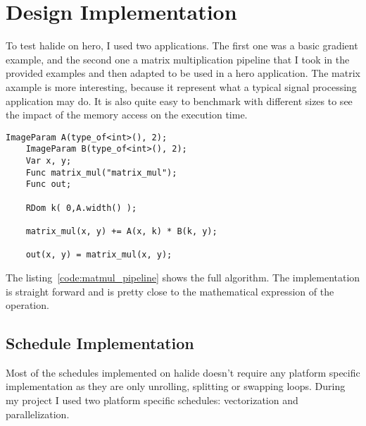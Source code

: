 

\chapter{Design Implementation}
	To test halide on hero, I used two applications. The first one was a basic gradient example, and the second one a matrix multiplication pipeline that I took in the provided examples and then adapted to be used in a hero application.
The matrix axample is more interesting, because it represent what a typical signal processing application may do. It is also quite easy to benchmark with different sizes to see the impact of the memory access on the execution time.

\lstset{basicstyle=\ttfamily\footnotesize,breaklines=true,tabsize=2}
\begin{lstlisting}[caption={Matrix Multiplication Pipeline}, captionpos=b, label={code:matmul_pipeline}]
    ImageParam A(type_of<int>(), 2);
    ImageParam B(type_of<int>(), 2);
    Var x, y;
    Func matrix_mul("matrix_mul");
    Func out;

    RDom k( 0,A.width() );

    matrix_mul(x, y) += A(x, k) * B(k, y);

    out(x, y) = matrix_mul(x, y);

\end{lstlisting}
	The listing~\ref{code:matmul_pipeline} shows the full algorithm. The implementation is straight forward and is pretty close to the mathematical expression of the operation.

\section{Schedule Implementation }
	Most of the schedules implemented on halide doesn't require any platform specific implementation as they are only unrolling, splitting or swapping loops. During my project I used two platform specific schedules: vectorization and parallelization.

